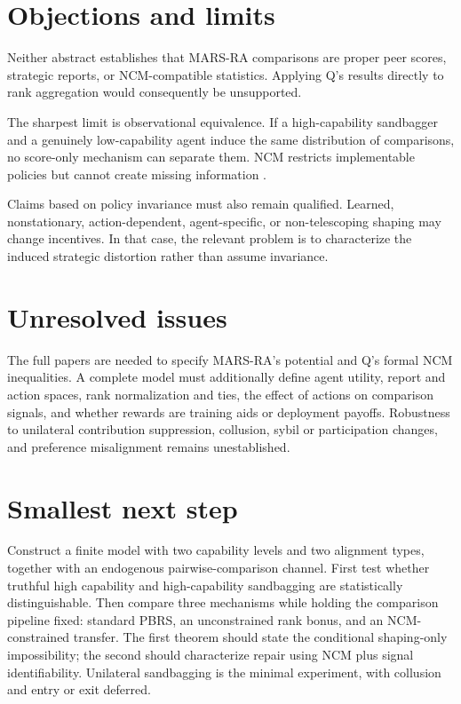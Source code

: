 \documentclass{article}
\begin{document}
\section{Objections and limits}

Neither abstract establishes that MARS-RA comparisons are proper peer scores, strategic reports, or NCM-compatible statistics. Applying Q's results directly to rank aggregation would consequently be unsupported.

The sharpest limit is observational equivalence. If a high-capability sandbagger and a genuinely low-capability agent induce the same distribution of comparisons, no score-only mechanism can separate them. NCM restricts implementable policies but cannot create missing information .

Claims based on policy invariance must also remain qualified. Learned, nonstationary, action-dependent, agent-specific, or non-telescoping shaping may change incentives. In that case, the relevant problem is to characterize the induced strategic distortion rather than assume invariance.

\section{Unresolved issues}

The full papers are needed to specify MARS-RA's potential and Q's formal NCM inequalities. A complete model must additionally define agent utility, report and action spaces, rank normalization and ties, the effect of actions on comparison signals, and whether rewards are training aids or deployment payoffs. Robustness to unilateral contribution suppression, collusion, sybil or participation changes, and preference misalignment remains unestablished.

\section{Smallest next step}

Construct a finite model with two capability levels and two alignment types, together with an endogenous pairwise-comparison channel. First test whether truthful high capability and high-capability sandbagging are statistically distinguishable. Then compare three mechanisms while holding the comparison pipeline fixed: standard PBRS, an unconstrained rank bonus, and an NCM-constrained transfer. The first theorem should state the conditional shaping-only impossibility; the second should characterize repair using NCM plus signal identifiability. Unilateral sandbagging is the minimal experiment, with collusion and entry or exit deferred.
\end{document}
